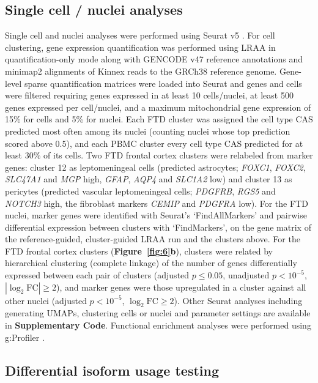 \subsection{Single cell / nuclei analyses}\label{single-cell-nuclei-analyses}

Single cell and nuclei analyses were performed using Seurat v5 \citep{hao2024}. For cell clustering, gene expression quantification was performed using LRAA in quantification-only mode along with GENCODE v47 reference annotations \citep{gencodendb} and minimap2 alignments of Kinnex reads to the GRCh38 reference genome. Gene-level sparse quantification matrices were loaded into Seurat and genes and cells were filtered requiring genes expressed in at least 10 cells/nuclei, at least 500 genes expressed per cell/nuclei, and a maximum mitochondrial gene expression of 15\% for cells and 5\% for nuclei. Each FTD cluster was assigned the cell type CAS \citep{williams2025} predicted most often among its nuclei (counting nuclei whose top prediction scored above 0.5), and each PBMC cluster every cell type CAS predicted for at least 30\% of its cells. Two FTD frontal cortex clusters were relabeled from marker genes: cluster 12 as leptomeningeal cells (predicted astrocytes; \emph{FOXC1}, \emph{FOXC2}, \emph{SLC47A1} and \emph{MGP} high, \emph{GFAP}, \emph{AQP4} and \emph{SLC1A2} low) and cluster 13 as pericytes (predicted vascular leptomeningeal cells; \emph{PDGFRB}, \emph{RGS5} and \emph{NOTCH3} high, the fibroblast markers \emph{CEMIP} and \emph{PDGFRA} low). For the FTD nuclei, marker genes were identified with Seurat's `FindAllMarkers' and pairwise differential expression between clusters with `FindMarkers', on the gene matrix of the reference-guided, cluster-guided LRAA run and the clusters above. For the FTD frontal cortex clusters (\textbf{Figure~\ref{fig:6}b}), clusters were related by hierarchical clustering (complete linkage) of the number of genes differentially expressed between each pair of clusters (adjusted $p \leq 0.05$, unadjusted $p < 10^{-5}$, $|\log_2 \mathrm{FC}| \geq 2$), and marker genes were those upregulated in a cluster against all other nuclei (adjusted $p < 10^{-5}$, $\log_2 \mathrm{FC} \geq 2$). Other Seurat analyses including generating UMAPs, clustering cells or nuclei and parameter settings are available in \textbf{Supplementary Code}. Functional enrichment analyses were performed using g:Profiler \citep{kolberg2020}.

\subsection{Differential isoform usage testing}\label{differential-isoform-usage-testing}

